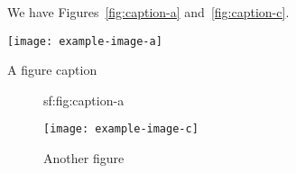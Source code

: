 \documentclass{article}
\renewcommand{\label}[1]{%
    \gdef\sfname{sf:##1}}%
\newcommand{\reusefigure}[2][htbp]{%
  {\addtocounter{figure}{-1}%
   \renewcommand{\theHfigure}{dupe-fig}%
   \renewcommand{\thefigure}{\ref{#2}}%
   \renewcommand{\addcontentsline}[3]{}%
   \renewcommand{\label}[1]{}%
   \begin{figure}[#1] \csname sf:#2\endcsname \end{figure}}
}
\begin{document}
We have Figures~\ref{fig:caption-a} and~\ref{fig:caption-c}.

\begin{sourcefigure}[ht]
  \centering\texttt{[image: example-image-a]}
  \caption{A figure caption}\label{fig:caption-a}
\end{sourcefigure}

\reusefigure[ht]{fig:caption-a}

\begin{figure}[ht]
  \centering\texttt{[image: example-image-c]}
  \caption{Another figure}\label{fig:caption-c}
\end{figure}
\end{document}

